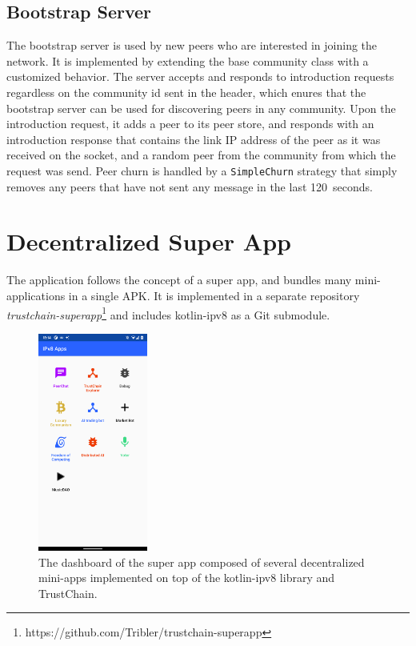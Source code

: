 \section{Bootstrap Server}

The bootstrap server is used by new peers who are interested in joining the network. It is implemented by extending the base community class with a customized behavior. The server accepts and responds to introduction requests regardless on the community id sent in the header, which enures that the bootstrap server can be used for discovering peers in any community. Upon the introduction request, it adds a peer to its peer store, and responds with an introduction response that contains the link IP address of the peer as it was received on the socket, and a random peer from the community from which the request was send. Peer churn is handled by a \texttt{SimpleChurn} strategy that simply removes any peers that have not sent any message in the last 120~seconds.

\chapter{Decentralized Super App}

The application follows the concept of a super app, and bundles many mini-applications in a single APK. It is implemented in a separate repository \textit{trustchain-superapp}\footnote{https://github.com/Tribler/trustchain-superapp} and includes kotlin-ipv8 as a Git submodule.

\begin{figure}
    \centering
    \includegraphics[width=0.32\textwidth]{screens/superapp/superapp}
    \caption{The dashboard of the super app composed of several decentralized mini-apps implemented on top of the kotlin-ipv8 library and TrustChain.}
    \label{manyverse}
\end{figure}

